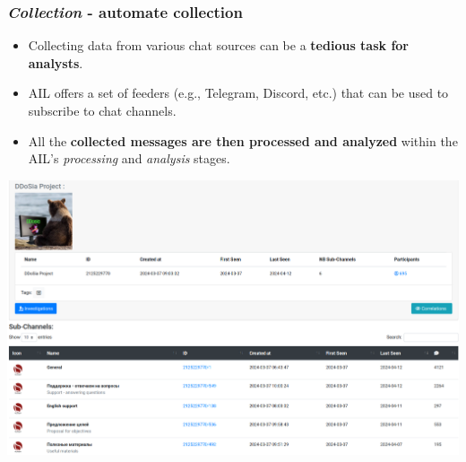 \documentclass{beamer}
\begin{document}
\begin{frame}
    \frametitle{{\it Collection} - automate collection}
	\begin{itemize}
		\item Collecting data from various chat sources can be a {\bf tedious task for analysts}.
		\item AIL offers a set of feeders (e.g., Telegram, Discord, etc.) that can be used to subscribe to chat channels.
        \item All the {\bf collected messages are then processed and analyzed} within the AIL's \textit{processing} and \textit{analysis} stages.
	\end{itemize}
\begin{center}
    \includegraphics[scale=0.18]{screenshot/chat-forum.png}
\end{center}
\end{frame}

\end{document}
